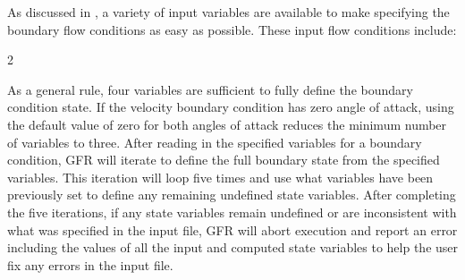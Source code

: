 As discussed in , a variety of input variables are available
to make specifying the boundary flow conditions as easy as possible.
%
These input flow conditions include:
%
\begin{multicols}{2}
\begin{InputExample}
  \item[{\BCinpBC[nmlBC::BCInput/Pressure]{Pressure}}]
  \item[{\BCinpBC[nmlBC::BCInput/Temperature]{Temperature}}]
  \item[{\BCinpBC[nmlBC::BCInput/Density]{Density}}]
  \item[{\BCinpBC[nmlBC::BCInput/Mach]{Mach}}]
  \item[{\BCinpBC[nmlBC::BCInput/AoAAlpha]{AoA\_Alpha}}]
  \item[{\BCinpBC[nmlBC::BCInput/AoABeta]{AoA\_Beta}}]
  \item[{\BCinpBC[nmlBC::BCInput/TotalPressure]{Total\_Pressure}}]
  \item[{\BCinpBC[nmlBC::BCInput/TotalTemperature]{Total\_Temperature}}]
  \item[{\BCinpBC[nmlBC::BCInput/TotalDensity]{Total\_Density}}]
  \item[{\BCinpBC[nmlBC::BCInput/VelocityX]{VelocityX}}]
  \item[{\BCinpBC[nmlBC::BCInput/VelocityY]{VelocityY}}]
  \item[{\BCinpBC[nmlBC::BCInput/VelocityZ]{VelocityZ}}]
\end{InputExample}
\end{multicols}


As a general rule, four variables are sufficient to fully define the boundary
condition state.
%
If the velocity boundary condition has zero angle of attack,
using the default value of zero for both angles of attack reduces the minimum
number of variables to three.
%
After reading in the specified variables for a boundary condition, GFR will
iterate to define the full boundary state from the specified variables.
%
This iteration will loop five times and use what variables have been previously
set to define any remaining undefined state variables.
%
After completing the five iterations, if
any state variables remain undefined or are inconsistent with what was specified
in the input file, GFR will abort execution and report an error including the
values of all the input and computed state variables to help the user fix any
errors in the input file.

